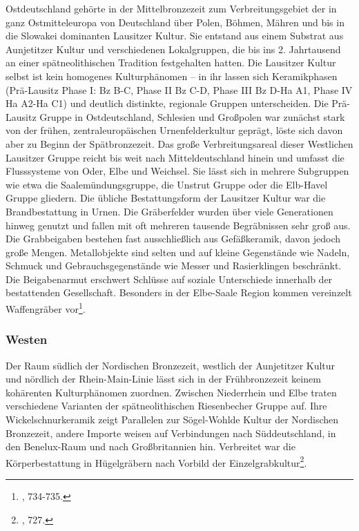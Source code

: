 \documentclass[openany,twoside,twocolumn]{book}
\let\rmarkdownfootnote\footnote%
\def\footnote{\protect\rmarkdownfootnote}
\begin{document}
Ostdeutschland gehörte in der Mittelbronzezeit zum Verbreitungsgebiet
der in ganz Ostmitteleuropa von Deutschland über Polen, Böhmen, Mähren
und bis in die Slowakei dominanten Lausitzer Kultur. Sie entstand aus
einem Substrat aus Aunjetitzer Kultur und verschiedenen Lokalgruppen,
die bis ins 2. Jahrtausend an einer spätneolithischen Tradition
festgehalten hatten. Die Lausitzer Kultur selbst ist kein homogenes
Kulturphänomen -- in ihr lassen sich Keramikphasen (Prä-Lausitz Phase I:
Bz B-C, Phase II Bz C-D, Phase III Bz D-Ha A1, Phase IV Ha A2-Ha C1) und
deutlich distinkte, regionale Gruppen unterscheiden. Die Prä-Lausitz
Gruppe in Ostdeutschland, Schlesien und Großpolen war zunächst stark von
der frühen, zentraleuropäischen Urnenfelderkultur geprägt, löste sich
davon aber zu Beginn der Spätbronzezeit. Das große Verbreitungsareal
dieser Westlichen Lausitzer Gruppe reicht bis weit nach
Mitteldeutschland hinein und umfasst die Flusssysteme von Oder, Elbe und
Weichsel. Sie lässt sich in mehrere Subgruppen wie etwa die
Saalemündungsgruppe, die Unstrut Gruppe oder die Elb-Havel Gruppe
gliedern. Die übliche Bestattungsform der Lausitzer Kultur war die
Brandbestattung in Urnen. Die Gräberfelder wurden über viele
Generationen hinweg genutzt und fallen mit oft mehreren tausende
Begräbnissen sehr groß aus. Die Grabbeigaben bestehen fast
ausschließlich aus Gefäßkeramik, davon jedoch große Mengen.
Metallobjekte sind selten und auf kleine Gegenstände wie Nadeln, Schmuck
und Gebrauchsgegenstände wie Messer und Rasierklingen beschränkt. Die
Beigabenarmut erschwert Schlüsse auf soziale Unterschiede innerhalb der
bestattenden Gesellschaft. Besonders in der Elbe-Saale Region kommen
vereinzelt Waffengräber vor\footnote{\textcite{jockenhovel_germany_2013},
  734-735.}.

\hypertarget{westen}{%
\subsubsection{Westen}\label{westen}}

Der Raum südlich der Nordischen Bronzezeit, westlich der Aunjetitzer
Kultur und nördlich der Rhein-Main-Linie lässt sich in der
Frühbronzezeit keinem kohärenten Kulturphänomen zuordnen. Zwischen
Niederrhein und Elbe traten verschiedene Varianten der spätneolithischen
Riesenbecher Gruppe auf. Ihre Wickelschnurkeramik zeigt Parallelen zur
Sögel-Wohlde Kultur der Nordischen Bronzezeit, andere Importe weisen auf
Verbindungen nach Süddeutschland, in den Benelux-Raum und nach
Großbritannien hin. Verbreitet war die Körperbestattung in Hügelgräbern
nach Vorbild der Einzelgrabkultur\footnote{\textcite{jockenhovel_germany_2013},
  727.}.
\end{document}
